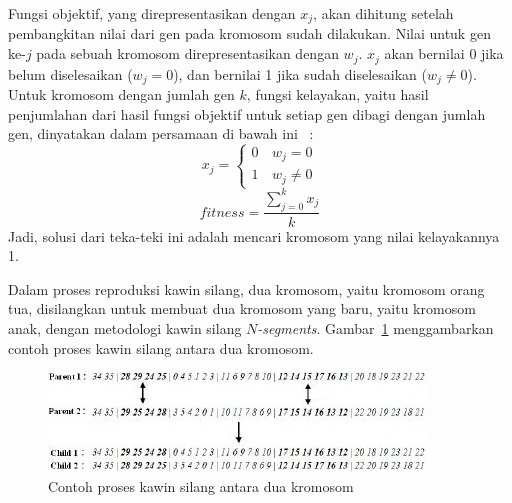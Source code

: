 Fungsi objektif, yang direpresentasikan dengan \begin{math}x_j\end{math}, akan dihitung setelah pembangkitan nilai dari gen pada kromosom sudah dilakukan. Nilai untuk gen ke-\begin{math}j\end{math} pada sebuah kromosom direpresentasikan dengan \begin{math}w_j\end{math}. \begin{math}x_j\end{math} akan bernilai 0 jika belum diselesaikan (\begin{math}w_j = 0\end{math}), dan bernilai 1 jika sudah diselesaikan (\begin{math}w_j \neq 0\end{math}). Untuk kromosom dengan jumlah gen \begin{math}k\end{math}, fungsi kelayakan, yaitu hasil penjumlahan dari hasil fungsi objektif untuk setiap gen dibagi dengan jumlah gen, dinyatakan dalam persamaan di bawah ini ~\cite{johanna:12:hybrid}:
\begin{displaymath}
x_j = 
\begin{cases}
0\, & w_j = 0 \\
1\, & w_j \neq 0
\end{cases}
\end{displaymath}
\begin{displaymath}
fitness = \frac{\sum_{j=0}^k x_j}{k}
\end{displaymath}
Jadi, solusi dari teka-teki ini adalah mencari kromosom yang nilai kelayakannya 1.

Dalam proses reproduksi kawin silang, dua kromosom, yaitu kromosom orang tua, disilangkan untuk membuat dua kromosom yang baru, yaitu kromosom anak, dengan metodologi kawin silang \textit{\begin{math}N\end{math}-segments}. Gambar~\ref{fig:hybrid9} menggambarkan contoh proses kawin silang antara dua kromosom.

\begin{figure}
\centering
\captionsetup{justification=centering}
\includegraphics[scale=1]{Gambar/HybridGenetic9}
\caption[Contoh proses kawin silang antara dua kromosom ~\cite{johanna:12:hybrid}]{Contoh proses kawin silang antara dua kromosom ~\cite{johanna:12:hybrid}}
\label{fig:hybrid9}
\end{figure}

